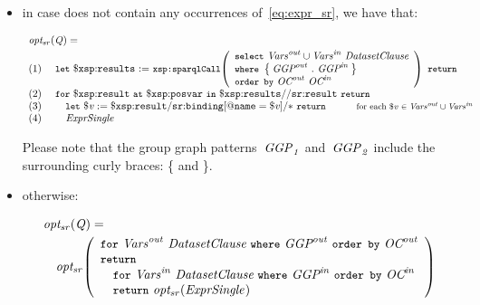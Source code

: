 \begin{itemize}
\item in case \envElem{\ExprSingle}{} does not contain any occurrences of~\eqref{eq:expr_sr}, we have that:
\begin{small}
\begin{equation*}
\begin{array}{l}
  \funcCall{opt_{sr}}{\envElem{Q}{}} = \\[.3em]
    \mathrm{(1)~~~~}\LET~\varR{results}~\mathtt{:=}~\funcCallR{sparqlCall}{
                    \begin{array}{l}
                      \SELECT~\gsup{\Vars}{out}\cup\gsup{\Vars}{in}~\DatasetClause\\
                      \WHERE~\set{\gsup{\GroupGraphPattern}{out}~.~\gsup{\GroupGraphPattern}{in}}\\
                      \ORDERBY~\gsup{\OrderCondition}{out}~\gsup{\OrderCondition}{in}\\
                    \end{array}}~\RETURN\\
    \mathrm{(2)~~~~} \FOR~\varR{result}~\AT~\varR{posvar}~\IN~\varR{results//sr{:}result}~\RETURN \\
    \mathrm{(3)~~~~} \quad \LET~\var{v} := \varR{result/sr{:}binding[@name = \var{v}]/*}~\RETURN \hfill\qquad\quad \textrm{\smaller for each \var{v}~$\in \gsup{\Vars}{out}\cup\gsup{\Vars}{in}$}\\
    \mathrm{(4)~~~~} \quad\grammarRule{ExprSingle} \\
 \end{array}
\end{equation*}
\end{small}%
%
Please note that the group graph patterns~${\mathit{GGP}}_{\mathit{1}}^{\mathit{}}$ and~${\mathit{GGP}}_{\mathit{2}}^{\mathit{}}$ include the surrounding curly braces: \{ and
\}.
\item otherwise:
%
\begin{small}
\begin{equation*}
\begin{array}{r@{~~~}l}
  \multicolumn{2}{l}{\sr{\envElem{Q}{}} =}\\[.3em]
   & \sr{\begin{array}{l}
       \FOR~\gsup{\Vars}{out}~\DatasetClause~\WHERE~\gsup{\GroupGraphPattern}{out}~\ORDERBY~\gsup{\OrderCondition}{out}\\
       \RETURN\\
       \quad \FOR~\gsup{\Vars}{in}~\DatasetClause~\WHERE~\gsup{\GroupGraphPattern}{in}~\ORDERBY~\gsup{\OrderCondition}{in}\\
       \quad \RETURN~\sr{\envElem{ExprSingle}{}}
     \end{array}
   }
 \end{array}
\end{equation*}
\end{small}%
\end{itemize}

